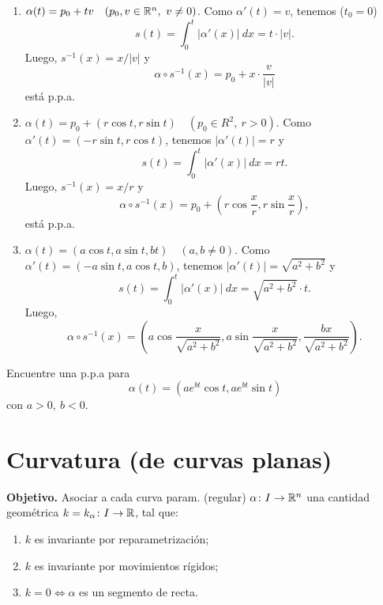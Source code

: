 
\begin{eg}
	\begin{enumerate}
		\item $\alpha(t) = p_{0} + tv \quad (p_{0},v \in \mathbb{R}^{n},\ v \neq 0)$. Como $\alpha'(t) = v$, tenemos ($t_{0} = 0$)
		\[ s(t) = \int_{0}^{t} |\alpha'(x)| \ dx = t \cdot |v|. \]
		Luego, $s^{-1}(x) = x \slash |v|$ y
		\[ \alpha \circ s^{-1}(x) = p_{0} + x \cdot \frac{v}{|v|} \]
		está p.p.a.

		\item $\alpha(t) = p_{0} + (r \cos t, r \sin t) \quad (p_{0} \in R^{2},\ r > 0)$. Como $\alpha'(t) = (-r \sin t, r \cos t)$, tenemos $|\alpha'(t)| = r$ y
		\[ s(t) = \int_{0}^{t} |\alpha'(x)| \ dx = rt. \]
		Luego, $s^{-1}(x) = x \slash r$ y
		\[ \alpha \circ s^{-1}(x) = p_{0} + \left( r \cos \frac{x}{r}, r \sin \frac{x}{r} \right), \]
		está p.p.a.

		\item $\alpha(t) = (a \cos t, a \sin t, bt) \quad (a,b \neq 0)$. Como $\alpha'(t) = (-a \sin t, a \cos t, b)$, tenemos $|\alpha'(t)| = \sqrt{a^{2} + b^{2}}$ y
		\[ s(t) = \int_{0}^{t} |\alpha'(x)| \ dx = \sqrt{a^{2} + b^{2}} \cdot t.\]
		Luego,
		\[ \alpha \circ s^{-1}(x) = \left( a \cos \frac{x}{\sqrt{a^{2} + b^{2}}}, a \sin \frac{x}{\sqrt{a^{2} + b^{2}}}, \frac{bx}{\sqrt{a^{2} + b^{2}}} \right). \]
	\end{enumerate}
\end{eg}

\begin{ex}
	Encuentre una p.p.a para
	\[ \alpha(t) = (a e^{bt} \cos t, a e^{bt} \sin t) \]
	con $a > 0,\ b < 0$.
\end{ex}

\section{Curvatura (de curvas planas)}

\textbf{Objetivo.} Asociar a cada curva param. (regular) $\alpha \colon I \to \mathbb{R}^{n}$ una cantidad geométrica $k = k_{\alpha} \colon I \to \mathbb{R}$, tal que:
\begin{enumerate}
	\item $k$ es invariante por reparametrización;

	\item $k$ es invariante por movimientos rígidos;

	\item $k = 0 \iff \alpha$ es un segmento de recta.
\end{enumerate}

